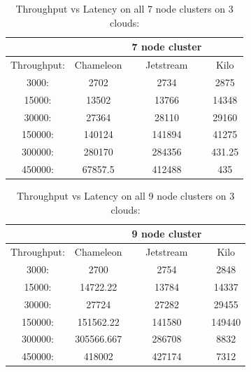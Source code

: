 \documentclass[9pt,twocolumn,twoside]{../../styles/osajnl}
\begin{document}
\begin{table}[!htb]
\centering
\caption{Throughput vs Latency on all 7 node clusters on 3 clouds:}\label{T:bench-7}
\begin{center}
 \begin{tabular}{|c|| c c c|} 
 \hline
  &   &7 node cluster & \\ [0.5ex]
 \hline\hline
 Throughput: & Chameleon & Jetstream & Kilo \\ 
 \hline
 3000: & 2702 & 2734 & 2875 \\
 \hline
 15000: & 13502 & 13766 & 14348 \\
 \hline
 30000: & 27364 & 28110 & 29160 \\
 \hline
 150000: & 140124& 141894 &41275 \\
 \hline
 300000: & 280170 & 284356 & 431.25\\
 \hline
 450000: & 67857.5 & 412488 & 435 \\
 \hline
\end{tabular}
\end{center}
\end{table}


\begin{table}[!htb]
\centering
\caption{Throughput vs Latency on all 9 node clusters on 3 clouds:}\label{T:bench-9}
\begin{center}
 \begin{tabular}{|c|| c c c|} 
 \hline
  &   &9 node cluster & \\ [0.5ex]
 \hline\hline
 Throughput: & Chameleon & Jetstream & Kilo \\ 
 \hline
 3000: & 2700 & 2754 & 2848 \\
 \hline
 15000: & 14722.22 & 13784 & 14337 \\
 \hline
 30000: & 27724 & 27282 & 29455 \\
 \hline
 150000: & 151562.22& 141580 & 149440 \\
 \hline
 300000: & 305566.667 &286708 & 8832 \\
 \hline
 450000: & 418002 & 427174 & 7312 \\
 \hline
\end{tabular}
\end{center}
\end{table}
\end{document}
